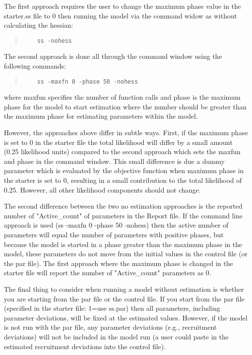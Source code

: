 The first approach requires the user to change the maximum phase value in the starter.ss file to 0 then running the model via the command widow as without calculating the hessian:

\begin{quote}
	\begin{verbatim}
	ss -nohess
	\end{verbatim}
\end{quote}

The second approach is done all through the command window using the following commands:

\begin{quote}
	\begin{verbatim}
	ss -maxfn 0 -phase 50 -nohess
	\end{verbatim}
\end{quote}

where maxfun specifies the number of function calls and phase is the maximum phase for the model to start estimation where the number should be greater than the maximum phase for estimating parameters within the model. 

However, the approaches above differ in subtle ways. First, if the maximum phase is set to 0 in the starter file the total likelihood will differ by a small amount (0.25 likelihood units) compared to the second approach which sets the maxfun and phase in the command window. This small difference is due a dummy parameter which is evaluated by the objective function when maximum phase in the starter is set to 0, resulting in a small contribution to the total likelihood of 0.25.  However, all other likelihood components should not change.  

The second difference between the two no estimation approaches is the reported number of "Active\_count" of parameters in the Report file. If the command line approach is used (ss -maxfn 0 -phase 50 -nohess) then the active number of parameters will equal the number of parameters with positive phases, but because the model is started in a phase greater than the maximum phase in the model, these parameters do not move from the initial values in the control file (or the par file).  The first approach where the maximum phase is changed in the starter file will report the number of "Active\_count" parameters as 0.  

The final thing to consider when running a model without estimation is whether you are starting from the par file or the control file.  If you start from the par file (specified in the starter file: 1=use ss.par) then all parameters, including parameter deviations, will be fixed at the estimated values.  However, if the model is not run with the par file, any parameter deviations (e.g., recruitment deviations) will not be included in the model run (a user could paste in the estimated recruitment deviations into the control file). 

